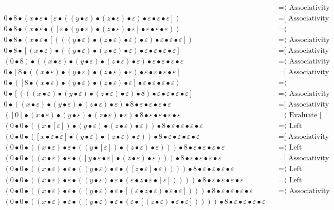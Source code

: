 \documentclass{article}
\begin{document}
\begin{align*}
  & \quad \text{=⟨ Associativity ]}\\
0 • 8 • (x • ε • [ε • ((y • ε) • (z • ε) • ε) • ε • ε • ε])
  & \quad \text{=[ Associativity ⟩}\\
0 • 8 • (x • ε • ([ε • (y • ε) • (z • ε) • ε] • ε • ε • ε))
  & \quad \text{=⟨ Commutativity ]}\\
0 • 8 • (x • ε • [(((y • ε) • (z • ε) • ε) • ε) • ε • ε • ε])
  & \quad \text{=⟨ Associativity ]}\\
0 • 8 • [(x • ε) • ((y • ε) • (z • ε) • ε) • ε • ε • ε • ε]
  & \quad \text{=[ Associativity ⟩}\\
(0 • 8) • ((x • ε) • (y • ε) • (z • ε) • ε) • ε • ε • ε • ε
  & \quad \text{=⟨ Associativity ]}\\
0 • [8 • ((x • ε) • (y • ε) • (z • ε) • ε) • ε • ε • ε • ε]
  & \quad \text{=[ Associativity ⟩}\\
0 • ([8 • (x • ε) • (y • ε) • (z • ε) • ε] • ε • ε • ε • ε)
  & \quad \text{=⟨ Commutativity ]}\\
0 • [(((x • ε) • (y • ε) • (z • ε) • ε) • 8) • ε • ε • ε • ε]
  & \quad \text{=⟨ Associativity ]}\\
0 • ((x • ε) • (y • ε) • (z • ε) • ε) • 8 • ε • ε • ε • ε
  & \quad \text{=[ Associativity ⟩}\\
([0] • (x • ε) • (y • ε) • (z • ε) • ε) • 8 • ε • ε • ε • ε
  & \quad \text{=⟨ Evaluate ]}\\
(0 • 0 • ((x • [ε]) • (y • ε) • (z • ε) • ε)) • 8 • ε • ε • ε • ε
  & \quad \text{=⟨ Left neutrality ]}\\
(0 • 0 • ([x • ε • ε] • (y • ε) • (z • ε) • ε)) • 8 • ε • ε • ε • ε
  & \quad \text{=[ Associativity ⟩}\\
(0 • 0 • ((x • ε) • ε • ((y • [ε]) • (z • ε) • ε))) • 8 • ε • ε • ε • ε
  & \quad \text{=⟨ Left neutrality ]}\\
(0 • 0 • ((x • ε) • ε • ([y • ε • ε] • (z • ε) • ε))) • 8 • ε • ε • ε • ε
  & \quad \text{=[ Associativity ⟩}\\
(0 • 0 • ((x • ε) • ε • ((y • ε) • ε • ([z • ε] • ε)))) • 8 • ε • ε • ε • ε
  & \quad \text{=⟨ Left neutrality ]}\\
(0 • 0 • ((x • ε) • ε • ((y • ε) • ε • (ε • z • ε • [ε])))) • 8 • ε • ε • ε • ε
  & \quad \text{=⟨ Left neutrality ]}\\
(0 • 0 • ((x • ε) • ε • ((y • ε) • ε • [(ε • z • ε) • ε • ε]))) • 8 • ε • ε • ε • ε
  & \quad \text{=⟨ Associativity ]}\\
(0 • 0 • ((x • ε) • ε • ((y • ε) • ε • (ε • [(z • ε) • ε • ε])))) • 8 • ε • ε • ε • ε

\end{align*}
\end{document}
